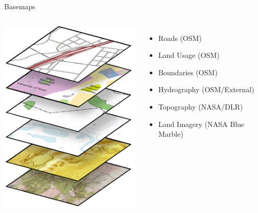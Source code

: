 \documentclass{beamer}
\begin{document}
\begin{frame}{Basemaps}
 \begin{columns}
   \includegraphics[scale=0.5]{basemap_layers}
   \begin{itemize}
    \item Roads (OSM)
    \item Land Usage (OSM)
    \item Boundaries (OSM)
    \item Hydrography (OSM/External)
    \item Topography (NASA/DLR)
    \item Land Imagery (NASA Blue Marble)
   \end{itemize}
 \end{columns}
\end{frame}
\end{document}
